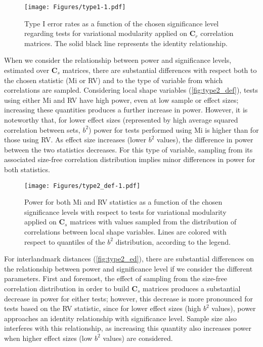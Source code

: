 \documentclass[12pt,]{article}
\begin{document}
\begin{figure}[htbp]
\centering
\texttt{[image: Figures/type1-1.pdf]}
\caption{Type I error rates as a function of the chosen significance
level regarding tests for variational modularity applied on
$\mathbf{C}_r$ correlation matrices. The solid black line represents the
identity relationship. \label{fig:type1}}
\end{figure}

When we consider the relationship between power and significance levels,
estimated over $\mathbf{C}_s$ matrices, there are substantial
differences with respect both to the chosen statistic (Mi or RV) and to
the type of variable from which correlations are sampled. Considering
local shape variables (\autoref{fig:type2_def}), tests using either Mi
and RV have high power, even at low sample or effect sizes; increasing
these quantities produces a further increase in power. However, it is
noteworthy that, for lower effect sizes (represented by high average
squared correlation between sets, $b^2$) power for tests performed using
Mi is higher than for those using RV. As effect size increases (lower
$b^2$ values), the difference in power between the two statistics
decreases. For this type of variable, sampling from its associated
size-free correlation distribution implies minor differences in power
for both statistics.

\begin{figure}[htbp]
\centering
\texttt{[image: Figures/type2\_def-1.pdf]}
\caption{Power for both Mi and RV statistics as a function of the chosen
significance levels with respect to tests for variational modularity
applied on $\mathbf{C}_s$ matrices with values sampled from the
distribution of correlations between local shape variables. Lines are
colored with respect to quantiles of the $b^2$ distribution, according
to the legend. \label{fig:type2_def}}
\end{figure}

For interlandmark distances (\autoref{fig:type2_ed}), there are
substantial differences on the relationship between power and
significance level if we consider the different parameters. First and
foremost, the effect of sampling from the size-free correlation
distribution in order to build $\mathbf{C}_s$ matrices produces a
substantial decrease in power for either tests; however, this decrease
is more pronounced for tests based on the RV statistic, since for lower
effect sizes (high $b^2$ values), power approaches an identity
relationship with significance level. Sample size also interferes with
this relationship, as increasing this quantity also increases power when
higher effect sizes (low $b^2$ values) are considered.
\end{document}
